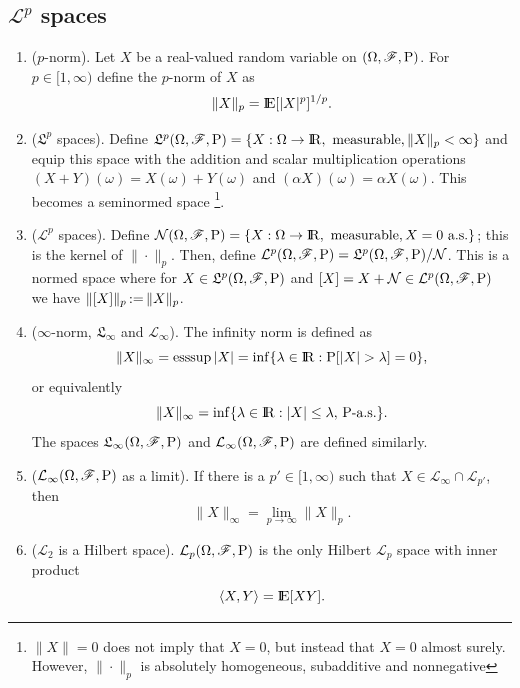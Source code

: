 \documentclass[a4paper,10pt]{article}
\begin{document}
\subsection{$\mathcal{L}^p$ spaces}
\begin{enumerate}
 \item ($p$-norm). Let $X$ be a real-valued random variable on $(\Omega,\mathscr{F},\mathrm{P})$. For $p\in[1,\infty)$ define the $p$-norm of $X$ as 
       \[
        \|X\|_p = \E[|X|^p]^{1/p}.
       \]
 \item ($\mathfrak{L}^p$ spaces). Define $\mathfrak{L}^p\ofp=\{X:\Omega\to\Re,\text{ measurable}, 
       \|X\|_p<\infty\}$ and equip this space with the addition and scalar multiplication 
       operations $(X+Y)(\omega) = X(\omega) + Y(\omega)$ and $(\alpha X)(\omega) = \alpha X(\omega)$.
       This becomes a seminormed space%
	  \footnote{$\|X\|=0$ does not imply that $X=0$, but instead 
		    that $X=0$ almost surely. However, $\|\cdot\|_p$ is absolutely 
		    homogeneous, subadditive and nonnegative}.%
 \item ($\mathcal{L}^p$ spaces). Define $\mathcal{N}\ofp = \{X:\Omega\to\Re,
       \text{ measurable}, X=0 \text{ a.s.}\}$; this is the kernel of $\|\cdot\|_p$. 
       Then, define $\mathcal{L}^p(\Omega,\mathscr{F},\mathrm{P}) = \mathfrak{L}^p(\Omega,\mathscr{F},\mathrm{P}) / \mathcal{N}$.
       This is a normed space where for $X\in\mathfrak{L}^p(\Omega,\mathscr{F},\mathrm{P})$ and $[X]=X+\mathcal{N}\in\mathcal{L}^p(\Omega,\mathscr{F},\mathrm{P})$
       we have $\|[X]\|_p {}\mathop{\mathrel{:}=}{} \|X\|_p$.
 \item ($\infty$-norm, $\mathfrak{L}_\infty$ and $\mathcal{L}_\infty$). The infinity norm is defined as 
	\[
	 \|X\|_\infty = \esssup |X| = \inf\{\lambda \in \Re: \prob[|X|> \lambda] = 0\},
	\]
	or equivalently 
	\[
	 \|X\|_\infty = \inf \{\lambda \in \Re: |X|\leq \lambda,\, \prob\text{-a.s.}\}.
	\]
	The spaces $\mathfrak{L}_\infty(\Omega,\mathscr{F},\mathrm{P})$ and $\mathcal{L}_\infty(\Omega,\mathscr{F},\mathrm{P})$ are defined 
	similarly.
 \item ($\mathcal{L}_\infty(\Omega,\mathscr{F},\mathrm{P})$ as a limit). If there is a $p'\in [1,\infty)$ such 
       that $X\in\mathcal{L}_\infty\cap \mathcal{L}_{p'}$, then
       \[
        \|X\|_\infty = \lim_{p\to\infty}\|X\|_p.
       \]

 \item ($\mathcal{L}_2$ is a Hilbert space). $\mathcal{L}_p(\Omega,\mathscr{F},\mathrm{P})$ is the only Hilbert 
       $\mathcal{L}_p$ space with inner product
       \[
        \<X,Y\> = \E[XY].
       \]


\end{enumerate}
\end{document}
